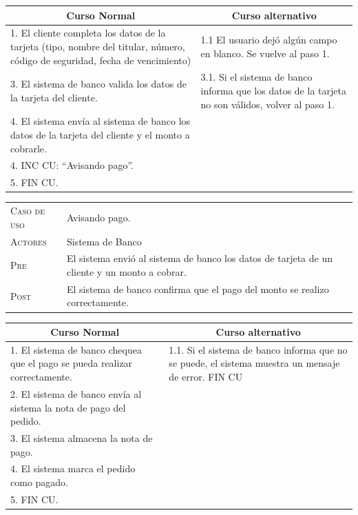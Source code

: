 \begin{center}
\begin{tabular}{|p{}|p{}|}
    \hline
    \multicolumn{1}{|c|}{Curso Normal} &
    \multicolumn{1}{|c|}{Curso alternativo} \\
    \hline
    1. El cliente completa los datos de la tarjeta (tipo, nombre del titular,
    número, código de seguridad, fecha de vencimiento) &
    1.1 El usuario dejó algún campo en blanco. Se vuelve al paso 1. \\
     3. El sistema de banco valida los datos de la tarjeta del cliente. &
   3.1. Si el sistema de banco informa que los datos de la tarjeta no son válidos, volver al paso 1. \\
   4. El sistema envía al sistema de banco los datos de la tarjeta del cliente y el monto a cobrarle. & \\
   4. INC CU: ``Avisando pago''. & \\
   5. FIN CU. & \\
    \hline
\end{tabular}
\end{center}

\newpage

\begin{tabular}{p{} p{}}
    \textsc{Caso de uso} & Avisando pago. \\
    \textsc{Actores} & Sistema de Banco \\
    \textsc{Pre} & El sistema envió al sistema de banco los datos de tarjeta de un cliente y un monto a cobrar. \\
    \textsc{Post} & El sistema de banco confirma que el pago del monto se realizo correctamente. \\
\end{tabular}

\begin{center}
\begin{tabular}{|p{}|p{}|}
    \hline
    \multicolumn{1}{|c|}{Curso Normal} &
    \multicolumn{1}{|c|}{Curso alternativo} \\
    \hline
    1. El sistema de banco chequea que el pago se pueda realizar correctamente.
    &
    1.1. Si el sistema de banco informa que no se puede, el sistema muestra un mensaje de error. FIN CU \\
    2. El sistema de banco envía al sistema la nota de pago del pedido. & \\
    3. El sistema almacena la nota de pago. & \\
    4. El sistema marca el pedido como pagado. & \\
    5. FIN CU. & \\
    \hline
\end{tabular}
\end{center}

